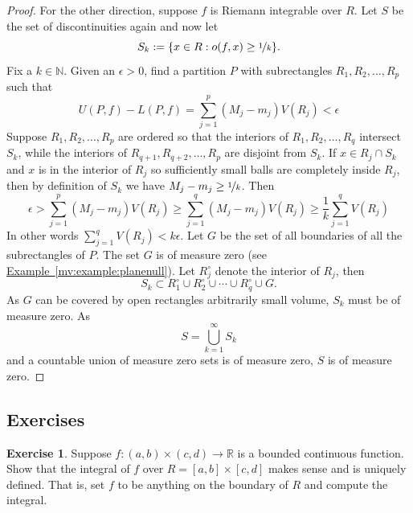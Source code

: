 \documentclass[12pt]{book}
\newcommand{\R}{{\mathbb{R}}}
\newcommand{\N}{{\mathbb{N}}}
\theoremstyle{plain}
\theoremstyle{remark}
\theoremstyle{definition}
\theoremstyle{exercise}
\newtheorem{exercise}{Exercise}[section]
\theoremstyle{example}
\newtheorem{example}[thm]{Example}
\newcommand{\exampleref}[1]{\hyperref[#1]{Example~\ref*{#1}}}
\begin{document}
\begin{proof}
For the other direction, suppose $f$ is Riemann integrable
over $R$.
Let $S$ be the set of discontinuities again and now let
\begin{equation*}
S_k := \{ x \in R : o(f,x) \geq \nicefrac{1}{k} \}.
\end{equation*}
Fix a $k \in \N$.
Given an $\epsilon > 0$, find a partition $P$ with subrectangles
$R_1,R_2,\ldots,R_p$ such that
\begin{equation*}
U(P,f)-L(P,f) =
\sum_{j=1}^p (M_j-m_j) V(R_j)
< \epsilon
\end{equation*}
Suppose $R_1,R_2,\ldots,R_p$ are ordered so that
the interiors of $R_1,R_2,\ldots,R_{q}$ intersect $S_k$,
while the interiors of $R_{q+1},R_{q+2},\ldots,R_p$
are disjoint from $S_k$.  If $x \in R_j \cap S_k$
and $x$ is in the interior of $R_j$ so
sufficiently small balls are completely inside $R_j$,
then by definition of $S_k$ we have
$M_j-m_j \geq \nicefrac{1}{k}$.
Then
\begin{equation*}
\epsilon >
\sum_{j=1}^p (M_j-m_j) V(R_j)
\geq
\sum_{j=1}^q (M_j-m_j) V(R_j)
\geq
\frac{1}{k}
\sum_{j=1}^q V(R_j)
\end{equation*}
In other words
$\sum_{j=1}^q V(R_j) < k \epsilon$.
Let $G$ be the set of all boundaries of all the subrectangles
of $P$.  The set $G$ is of measure zero (see \exampleref{mv:example:planenull}).
Let $R_j^\circ$ denote the interior of $R_j$, then
\begin{equation*}
S_k \subset R_1^\circ \cup R_2^\circ \cup \cdots \cup R_q^\circ \cup G .
\end{equation*}
As $G$ can be covered by open rectangles arbitrarily small volume,
$S_k$ must be of measure zero.  As
\begin{equation*}
S = \bigcup_{k=1}^\infty S_k
\end{equation*}
and a countable union of measure zero sets is of measure zero, 
$S$ is of measure zero.
\end{proof}

%

\subsection{Exercises}

\begin{exercise}
Suppose $f \colon (a,b) \times (c,d) \to \R$ is a bounded continuous
function.  Show that the integral of $f$ over $R = [a,b] \times [c,d]$ makes sense
and is uniquely defined.  That is, set $f$ to be anything on the boundary of
$R$ and compute the integral.
\end{exercise}
\end{document}
